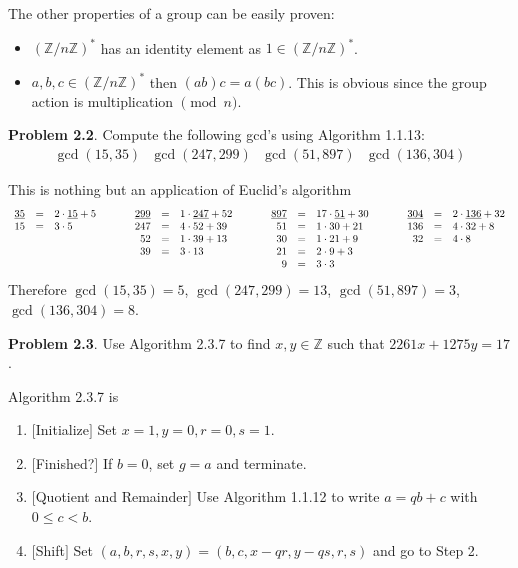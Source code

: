 \documentclass[aps,preprint,preprintnumbers,nofootinbib,showpacs,prd]{revtex4-1}
\newcommand{\ba}{\begin{array}}
\newcommand{\ea}{\end{array}}
\newcommand{\bit}{\begin{itemize}}
\newcommand{\eit}{\end{itemize}}
\newcommand{\nbea}{\begin{eqnarray*}}
\newcommand{\neea}{\end{eqnarray*}}
\begin{document}
The other properties of a group can be easily proven:
\bit
\item $(\mathbb{Z}/n\mathbb{Z})^*$ has an identity element as $1 \in (\mathbb{Z}/n\mathbb{Z})^*$.
\item $a,b,c \in (\mathbb{Z}/n\mathbb{Z})^*$ then $(ab)c = a(bc)$. This is obvious since the group action is multiplication $\pmod{n}$.
\eit

{\bf Problem 2.2}. Compute the following gcd’s using Algorithm 1.1.13:
%
\nbea
\gcd(15, 35) ~~~ \gcd(247, 299) ~~~ \gcd(51, 897) ~~~ \gcd(136, 304)
\neea
%

This is nothing but an application of Euclid's algorithm
%
\nbea
\ba{r c l   c   r c l    c    r c l    c   r c l}
\underline{35} & = & 2 \cdot \underline{15} + 5 & ~~~~~ & \underline{299} & = & 1 \cdot \underline{247} + 52 & ~~~~~ & \underline{897} & = & 17 \cdot \underline{51} + 30 & ~~~~~ & \underline{304} & = & 2 \cdot \underline{136} + 32 \\
15 & = & 3 \cdot 5 & ~~~ & 247 & = & 4 \cdot 52 + 39 & ~~~ & 51 & = & 1 \cdot 30 + 21 & ~~~ & 136 & = & 4 \cdot 32 + 8 \\
& & & ~~~ & 52 & = & 1 \cdot 39 + 13 & ~~~ & 30 & = & 1 \cdot 21 + 9 & ~~~ & 32 & = & 4 \cdot 8 \\
& & & ~~~ & 39 & = & 3 \cdot 13 & ~~~ & 21 & = & 2 \cdot 9 + 3 & ~~~ &  \\
& & & ~~~ & & & & ~~~ & 9 & = & 3 \cdot 3
\ea
\neea
%
Therefore $\gcd(15, 35) = 5$, $\gcd(247, 299) = 13$, $\gcd(51, 897) = 3$, $\gcd(136, 304) = 8$.

{\bf Problem 2.3}. Use Algorithm 2.3.7 to find $x, y \in \mathbb{Z}$ such that $2261x + 1275y = 17$.

Algorithm 2.3.7 is
\begin{enumerate}
\item $\lbrack$Initialize$\rbrack$ Set $x = 1, y = 0, r = 0, s = 1$.
\item $\lbrack$Finished?$\rbrack$ If $b = 0$, set $g = a$ and terminate.
\item $\lbrack$Quotient and Remainder$\rbrack$ Use Algorithm 1.1.12 to write $a = qb + c$ with $0 ≤ c < b$.
\item $\lbrack$Shift$\rbrack$ Set $(a, b, r, s, x, y) = (b, c, x - qr, y - qs, r, s)$ and go to Step 2.
\end{enumerate}
\end{document}
